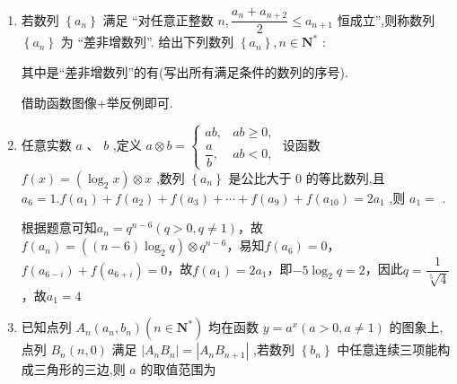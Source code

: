 \begin{enumerate}
\begin{jieda}
        易知$n < 2{a}_{1} + n - 1$，且二者一奇一偶，故可行解有$\left( {n,2{a}_{1} + n - 1}\right)  = \left( {8,{667}}\right)$ , $(23, 232)$ , $(29,184)$，共三组解.
    \end{jieda}
    \item 若数列 $\left\{  {a}_{n}\right\}$ 满足 “对任意正整数 $n,\dfrac{{a}_{n} + {a}_{n + 2}}{2} \leq  {a}_{n + 1}$ 恒成立”,则称数列 $\left\{  {a}_{n}\right\}$ 为 “差非增数列”. 给出下列数列 $\left\{  {a}_{n}\right\}  ,n \in  {\mathbf{N}}^{ * }$ :
    其中是“差非增数列”的有(写出所有满足条件的数列的序号).
    \begin{jieda}
        借助函数图像+举反例即可.
    \end{jieda}
    \item 任意实数 $a\text{ 、 }b$ ,定义 $a \otimes  b = \left\{  \begin{array}{ll} {ab}, & {ab} \geq  0, \\  \dfrac{a}{b}, & {ab} < 0, \end{array}\right.$ 设函数 $f\left( x\right)  = \left( {{\log }_{2}x}\right)  \otimes  x$ ,数列 $\left\{  {a}_{n}\right\}$ 是公比大于 0 的等比数列,且 ${a}_{6} = 1.f\left( {a}_{1}\right)  + f\left( {a}_{2}\right)  + f\left( {a}_{3}\right)  + \cdots  + f\left( {a}_{9}\right)  + f\left( {a}_{10}\right)  = 2{a}_{1}$ ,则 ${a}_{1} =$ .
    \begin{jieda}
        根据题意可知$a_n = q^{n-6}(q > 0, q \neq 1)$，故$f(a_n) = \left((n-6) {{\log }_{2}q}\right)  \otimes  q^{n-6}$，易知$f(a_6) = 0$，$f(a_{6-i}) + f(a_{6+i}) = 0$，故$f(a_1) = 2a_1$，即$-5{{\log }_{2}q} = 2$，因此$q = \dfrac{1}{\sqrt[5]{4}}$，故$a_1 = 4$
    \end{jieda}
    \item 已知点列 ${A}_{n}\left( {{a}_{n},{b}_{n}}\right) \left( {n \in  {\mathbf{N}}^{ * }}\right)$ 均在函数 $y = {a}^{x}\left( {a > 0,a \neq  1}\right)$ 的图象上,点列 ${B}_{n}\left( {n,0}\right)$ 满足 $\left| {{A}_{n}{B}_{n}}\right|  = \left| {{A}_{n}{B}_{n + 1}}\right|$ ,若数列 $\left\{  {b}_{n}\right\}$ 中任意连续三项能构成三角形的三边,则 $a$ 的取值范围为

\end{enumerate}
